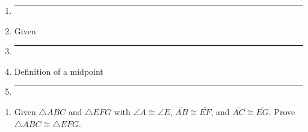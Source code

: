 \documentclass[12pt, twoside]{article}
\begin{document}
\begin{enumerate}
\begin{multicols}{2}
\begin{enumerate}[label={\arabic*)}]
      \item \rule{4cm}{0.15mm} \vspace{0.3cm}
      \item Given \vspace{0.3cm}
      \item \rule{4cm}{0.15mm} \vspace{0.3cm}
      \item Definition of a midpoint \vspace{0.3cm}
      \item \rule{4cm}{0.15mm} \vspace{0.3cm}
    \end{enumerate}
  \end{multicols}
  \end{enumerate}

\newpage
  \begin{enumerate}
\subsubsection*{4.6 Homework: Triangle congruence proofs}

  \item Given $\triangle ABC$ and $\triangle EFG$ with $\angle A \cong \angle E$, $\overline{AB} \cong \overline{EF}$, and $\overline{AC} \cong \overline{EG}$. Prove $\triangle ABC \cong \triangle EFG$.\\[0.5cm]


\end{enumerate}
\end{document}

